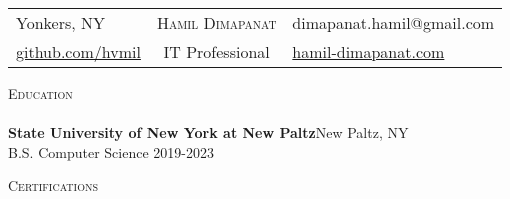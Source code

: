 \documentclass[a4paper]{article}
\newcommand{\lineunder} {
    \vspace*{-8pt} \\
    \hspace*{-18pt} \hrulefill \\
}
\newcommand{\header} [1] {
    {\hspace*{-18pt}\vspace*{5.5pt} \textsc{#1}}
    \vspace*{-6pt} \lineunder
}
\begin{document}
\vspace*{-40pt}
\fontsize{10}{11}\selectfont

\vspace*{-18pt}
\begin{center}
    \begin{tabularx}{\textwidth}{>{\raggedright\arraybackslash}Xc>{\raggedleft\arraybackslash}X}
        \hspace*{-3em} Yonkers, NY & \vspace{-3mm} {\Huge \scshape{Hamil Dimapanat}} & dimapanat.hamil@gmail.com \hspace*{-3em} \\
 
        \hspace*{-3em} \href{https://github.com/hvmil}{github.com/hvmil} &  IT Professional & \href{https://www.hamil-dimapanat.com/}{hamil-dimapanat.com}\hspace*{-3em} \\
    \end{tabularx}
\end{center}

\vspace{-2mm}



\header{Education}
\textbf{State University of New York at New Paltz}\hfill New Paltz, NY\\
B.S. Computer Science \hfill 2019-2023\\

\vspace{0mm}
\header{Certifications}
\vspace{0mm}
\end{document}
